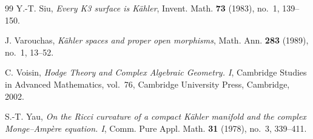 \documentclass[11pt,letterpaper]{amsart}
\numberwithin{equation}{section}
\begin{document}
\begin{thebibliography}{99}
Y.-T. Siu, \textit{Every K3 surface is K\"ahler}, Invent. Math. \textbf{73} (1983), no.~1, 139--150.

J. Varouchas, \textit{K\"ahler spaces and proper open morphisms}, Math. Ann. \textbf{283} (1989), no.~1, 13--52.

C. Voisin, \textit{Hodge Theory and Complex Algebraic Geometry. I}, Cambridge Studies in Advanced Mathematics, vol.~76, Cambridge University Press, Cambridge, 2002.

S.-T. Yau, \textit{On the Ricci curvature of a compact K\"ahler manifold and the complex Monge--Amp\`ere equation. I}, Comm. Pure Appl. Math. \textbf{31} (1978), no.~3, 339--411.

\end{thebibliography}
\end{document}
